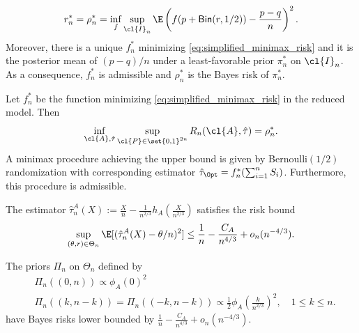 \begin{theorem}\label{thm:simplified_model_minimax_risk}\begin{equation}\label{eq:simplified_minimax_risk} r_n^* = \rho_n^* = \inf_f \sup_{\cl{I}_n} \E\left(f(p + \textsf{Bin}(r,1/2)) - \frac{p-q}{n} \right)^2.\end{equation} Moreover, there is a unique $f^*_n$ minimizing \eqref{eq:simplified_minimax_risk} and it is the posterior mean of $(p-q)/n$ under a least-favorable prior $\pi_n^*$ on $\cl{I}_n$. As a consequence, $f^*_n$ is admissible and $\rho_n^*$ is the Bayes risk of $\pi_n^*.$ \end{theorem} \begin{theorem}\label{thm:minimax_risk_reduction} Let $f_n^*$ be the function minimizing \eqref{eq:simplified_minimax_risk} in the reduced model. Then \begin{equation}\label{eq:minimax_risk_is_equal_to_simplified_minimax_risk}\inf_{\cl{A}, \hat \tau} \sup_{\cl{P} \in \set{0,1}^{2n}} R_n(\cl{A},\hat \tau) = \rho_n^*.\end{equation} A minimax procedure achieving the upper bound is given by Bernoulli$(1/2)$ randomization with corresponding estimator $\hat{\tau}_{\Opt}=f^*_n(\sum_{i=1}^n S_i)$. Furthermore, this procedure is admissible. \end{theorem} \begin{theorem}\label{thm:second_order_minimax_risk_behavior_detailed_upper_bound} The estimator $\hat \tau_n^A(X) := \frac{X}{n} - \frac{1}{n^{2/3}}h_A\left( \frac{X}{n^{2/3}}\right)$ satisfies the risk bound \[\sup_{(\theta,r) \in \Theta_n} \E[(\hat \tau_n^A(X) - \theta/n)^2] \leq \frac{1}{n} - \frac{C_A}{n^{4/3}} + o_n(n^{-4/3}).\] \end{theorem} \begin{theorem}\label{thm:second_order_minimax_risk_behavior_detailed_lower_bound} The priors $\Pi_n$ on $\Theta_n$ defined by \begin{align*}& \Pi_n((0,n)) \propto \phi_A(0)^2 \\ & \Pi_n((k,n-k)) = \Pi_n((-k,n-k)) \propto \frac{1}{2}\phi_A\left(\frac{k}{n^{2/3}}\right)^2, \quad 1\leq k \leq n.\end{align*} have Bayes risks lower bounded by $\frac{1}{n} - \frac{C_A}{n^{4/3}} + o_n(n^{-4/3}).$ \end{theorem}